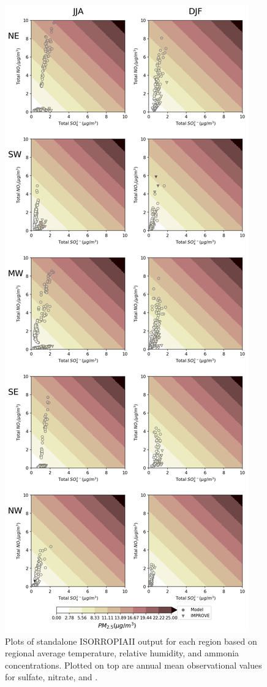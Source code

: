 \documentclass[12]{article}
\begin{document}
\begin{figure}
    \centering
    \includegraphics[scale=0.5]{ego_nonuclear_project/Figures/isorropia_obs_plot.png}
    \caption{Plots of standalone ISORROPIAII output for each region based on regional average temperature, relative humidity, and ammonia concentrations. Plotted on top are annual mean observational values for sulfate, nitrate, and .} 
    \label{fig:isorropia}
\end{figure}
\end{document}
